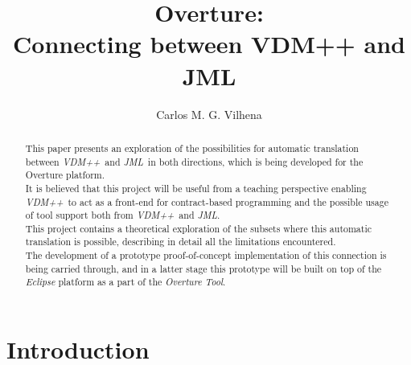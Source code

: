 
\newcommand{\jml}{\textit{JML}}
\newcommand{\vpp}{\textit{VDM++}}
\newcommand{\vdm}{\textit{VDM-SL}}
\newcommand{\java}{\textit{Java}}



\title{
Overture:\\
Connecting between VDM++ and JML
}

\author{Carlos M. G. Vilhena}


\maketitle

\begin{abstract}
This paper presents an exploration of the possibilities for automatic translation between \vpp\ and \jml\ in both directions, which is being developed for the Overture platform.\\
It is believed that this project will be useful from a teaching perspective enabling \vpp\ to act as a front-end for contract-based programming and the possible usage of tool support both from \vpp\ and \jml.\\
This project contains a theoretical exploration of the subsets where this automatic translation is possible, describing in detail all the limitations encountered.\\
The development of a prototype proof-of-concept implementation of this connection is being carried through, and in a latter stage this prototype will be built on top of the \textit{Eclipse} platform as a part of the \textit{Overture Tool}.
\end{abstract}

\section{Introduction}


